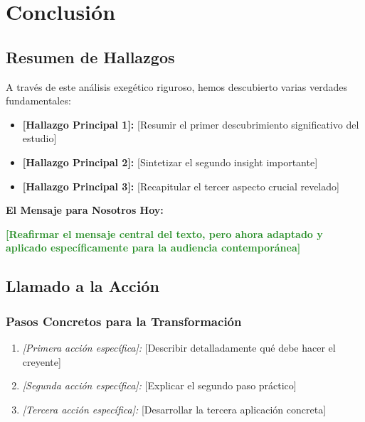 \documentclass[12pt,a4paper]{article}
\newcommand{\principio}[1]{\textcolor{forestgreen}{\textbf{#1}}}
\newcommand{\aplicacion}[1]{\textcolor{sagegreen}{\textit{#1}}}
\begin{document}
\section{Conclusión}

\subsection{Resumen de Hallazgos}

A través de este análisis exegético riguroso, hemos descubierto varias verdades fundamentales:

\begin{itemize}[leftmargin=*]
    \item \textbf{[Hallazgo Principal 1]:} [Resumir el primer descubrimiento significativo del estudio]
    \item \textbf{[Hallazgo Principal 2]:} [Sintetizar el segundo insight importante]
    \item \textbf{[Hallazgo Principal 3]:} [Recapitular el tercer aspecto crucial revelado]
\end{itemize}

\begin{mdframed}[style=ImportantBox]
\textbf{El Mensaje para Nosotros Hoy:}

\centering
\Large \principio{[Reafirmar el mensaje central del texto, pero ahora adaptado y aplicado específicamente para la audiencia contemporánea]}
\end{mdframed}

\subsection{Llamado a la Acción}

\subsubsection{Pasos Concretos para la Transformación}

\begin{enumerate}[leftmargin=*]
    \item \aplicacion{[Primera acción específica]:} [Describir detalladamente qué debe hacer el creyente]
    \item \aplicacion{[Segunda acción específica]:} [Explicar el segundo paso práctico]
    \item \aplicacion{[Tercera acción específica]:} [Desarrollar la tercera aplicación concreta]
\end{enumerate}
\end{document}
